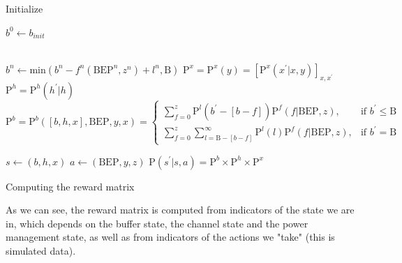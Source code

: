 \documentclass[a4paper, 12pt]{report}
\begin{document}
\begin{algorithm}[H]
  Initialize {\strut$b^0 \gets b_{init}$}\\
  \State $b^n \gets \mathrm{min}(b^n - f^n(\mathrm{BEP}^n, z^n) + l^n, \mathrm{B})$
  \State $\mathrm{P}^x = \mathrm{P}^x(y) = [\mathrm{P}^x(x^{'} | x,y)]_{x, x^{'}}$
  \State $\mathrm{P}^h = \mathrm{P}^h(h^{'}|h)$
  \State $ \mathrm{P}^b = \mathrm{P}^b([b, h, x], \mathrm{BEP}, y, x) = 
          \begin{cases}
          \sum_{f=0}^{z} \mathrm{P}^l(b^{'} - [b-f]) \mathrm{P}^f(f|\mathrm{BEP}, z), &\text{if } b^{'} \leq \mathrm{B} \\
          \sum_{f=0}^{z} \sum_{l=\mathrm{B}-[b-f]}^{\infty} \mathrm{P}^l (l) \mathrm{P}^f(f|\mathrm{BEP}, z), &\text{if } b^{'} = \mathrm{B}
          \end{cases}$
          
  \State $s \gets (b, h, x)$ 
  \State $a \gets (\mathrm{BEP}, y, z)$
  \State $\mathrm{P}(s^{'}|s, a) = \mathrm{P}^b \times \mathrm{P}^h \times \mathrm{P}^x$
  \caption{Computing the reward matrix}
\end{algorithm}

As we can see, the reward matrix is computed from indicators of the state we are in, which depends on the buffer state, the channel state
and the power management state, as well as from indicators of the actions we "take" (this is simulated data).
\end{document}
